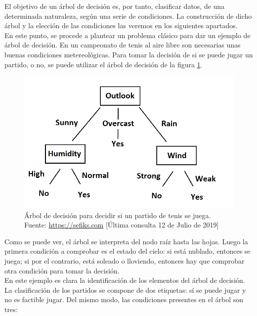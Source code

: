 			El objetivo de un \'arbol de decisi\'on es, por tanto, clasificar datos, de una determinada naturaleza, seg\'un una serie de condiciones. La construcci\'on de dicho \'arbol y la elecci\'on de las condiciones las veremos en los siguientes apartados.\\
		
			En este punto, se procede a plantear un problema cl\'asico para dar un ejemplo de \'arbol de decisi\'on. En un campeonato de tenis al aire libre son necesarias unas buenas condiciones metereol\'ogicas. Para tomar la decisi\'on de si se puede jugar un partido, o no, se puede utilizar el \'arbol de decisi\'on de la figura \ref{fig:tenis}.
			
			\begin{figure}[H]
    			\centering
    			\includegraphics[scale=0.5]{imagenes/tree.png}
    			\caption[\'Arbol de decisi\'on para jugar partido de tenis.]{\'Arbol de decisi\'on para decidir si un partido de tenis se juega.\\ Fuente: \url{https://sefiks.com} [\'Ultima consulta 12 de Julio de 2019]}
    			\label{fig:tenis}
		    \end{figure}
			
			Como se puede ver, el \'arbol se interpreta del nodo ra\'iz hasta las hojas. Luego la primera condici\'on a comprobar es el estado del cielo: si est\'a nublado, entonces se juega; si por el contrario, est\'a soleado o lloviendo, entonces hay que comprobar otra condici\'on para tomar la decisi\'on.\\
			
			En este ejemplo es clara la identificaci\'on de los elementos del \'arbol de decisi\'on. La clasificaci\'on de los partidos se compone de dos etiquetas: s\'i se puede jugar y no es factible jugar. Del mismo modo, las condiciones presentes en el \'arbol son tres:\\
			
